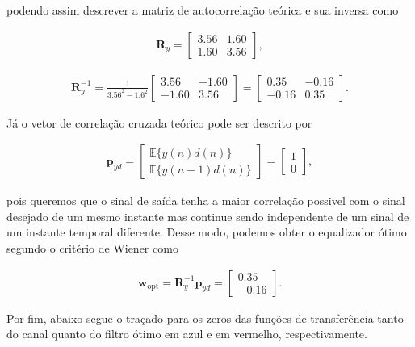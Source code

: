 podendo assim descrever a matriz de autocorrelação teórica e sua inversa como

\begin{align}
    \mathbf{R}_{y} =
    \begin{bmatrix}
        3.56 & 1.60 \\
        1.60 & 3.56
    \end{bmatrix},
\end{align}

\begin{align}
    \mathbf{R}^{-1}_{y} = \frac{1}{3.56^{2} - 1.6^{2}}
    \begin{bmatrix}
        3.56 &  -1.60 \\
        -1.60 & 3.56
    \end{bmatrix} =
    \begin{bmatrix}
        0.35 &  -0.16 \\
        -0.16 & 0.35
    \end{bmatrix}.
\end{align}

Já o vetor de correlação cruzada teórico pode ser descrito por

\begin{align}
    \mathbf{p}_{yd} =
    \begin{bmatrix}
        \mathbb{E}\{y(n)d(n)\} \\
        \mathbb{E}\{y(n - 1)d(n)\}
    \end{bmatrix} = 
    \begin{bmatrix}
        1 \\
        0
    \end{bmatrix},
\end{align}

pois queremos que o sinal de saída tenha a maior correlação possivel com o sinal desejado de um mesmo instante mas continue sendo independente de um sinal de um instante temporal diferente.
Desse modo, podemos obter o equalizador ótimo segundo o critério de Wiener como

\begin{align}
    \mathbf{w}_{\text{opt}} = \mathbf{R}^{-1}_{y} \mathbf{p}_{yd} = \begin{bmatrix}
        0.35 \\
        -0.16
    \end{bmatrix}.
\end{align}

Por fim, abaixo segue o traçado para os zeros das funções de transferência tanto do canal quanto do filtro ótimo em azul e em vermelho, respectivamente.

